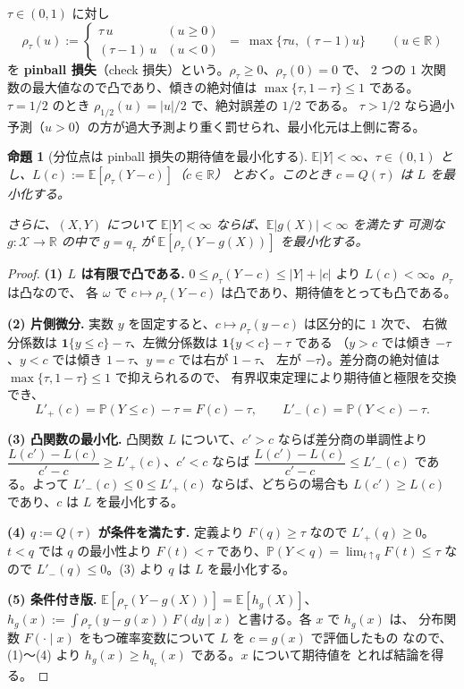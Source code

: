 \documentclass[a4paper,11pt]{jsarticle}
\theoremstyle{definition}
\theoremstyle{plain}
\newtheorem{proposition}[definition]{命題}
\theoremstyle{remark}
\newcommand{\Prob}{\mathbb{P}}
\newcommand{\Exp}{\mathbb{E}}
\newcommand{\Real}{\mathbb{R}}
\newcommand{\Ind}{\mathbf{1}}                  %
\begin{document}
$\tau\in(0,1)$ に対し
\begin{equation}
  \label{eq:pinball}
  \rho_\tau(u):=\begin{cases}\tau\,u & (u\ge0)\\ (\tau-1)\,u & (u<0)\end{cases}
  \ =\ \max\{\tau u,\ (\tau-1)u\}\qquad(u\in\Real)
\end{equation}
を \textbf{pinball 損失}（check 損失）という。$\rho_\tau\ge0$、$\rho_\tau(0)=0$ で、
$2$ つの $1$ 次関数の最大値なので凸であり、傾きの絶対値は $\max\{\tau,1-\tau\}\le1$
である。$\tau=1/2$ のとき $\rho_{1/2}(u)=|u|/2$ で、絶対誤差の $1/2$ である。
$\tau>1/2$ なら過小予測（$u>0$）の方が過大予測より重く罰せられ、最小化元は上側に寄る。

\begin{proposition}[分位点は pinball 損失の期待値を最小化する]
  \label{prop:pinball-quantile}
  $\Exp|Y|<\infty$、$\tau\in(0,1)$ とし、$L(c):=\Exp[\rho_\tau(Y-c)]$（$c\in\Real$）
  とおく。このとき $c=Q(\tau)$ は $L$ を最小化する。

  さらに、$(X,Y)$ について $\Exp|Y|<\infty$ ならば、$\Exp|g(X)|<\infty$ を満たす
  可測な $g\colon\mathcal{X}\to\Real$ の中で $g=q_\tau$ が
  $\Exp[\rho_\tau(Y-g(X))]$ を最小化する。
\end{proposition}

\begin{proof}
  \textbf{(1) $L$ は有限で凸である.}
  $0\le\rho_\tau(Y-c)\le|Y|+|c|$ より $L(c)<\infty$。$\rho_\tau$ は凸なので、
  各 $\omega$ で $c\mapsto\rho_\tau(Y-c)$ は凸であり、期待値をとっても凸である。

  \textbf{(2) 片側微分.}
  実数 $y$ を固定すると、$c\mapsto\rho_\tau(y-c)$ は区分的に $1$ 次で、
  右微分係数は $\Ind\{y\le c\}-\tau$、左微分係数は $\Ind\{y<c\}-\tau$ である
  （$y>c$ では傾き $-\tau$、$y<c$ では傾き $1-\tau$、$y=c$ では右が $1-\tau$、
  左が $-\tau$）。差分商の絶対値は $\max\{\tau,1-\tau\}\le1$ で抑えられるので、
  有界収束定理により期待値と極限を交換でき、
  \begin{equation*}
    L'_+(c)=\Prob(Y\le c)-\tau=F(c)-\tau,\qquad L'_-(c)=\Prob(Y<c)-\tau .
  \end{equation*}

  \textbf{(3) 凸関数の最小化.}
  凸関数 $L$ について、$c'>c$ ならば差分商の単調性より
  $\dfrac{L(c')-L(c)}{c'-c}\ge L'_+(c)$、$c'<c$ ならば
  $\dfrac{L(c')-L(c)}{c'-c}\le L'_-(c)$ である。よって $L'_-(c)\le0\le L'_+(c)$
  ならば、どちらの場合も $L(c')\ge L(c)$ であり、$c$ は $L$ を最小化する。

  \textbf{(4) $q:=Q(\tau)$ が条件を満たす.}
  定義より $F(q)\ge\tau$ なので $L'_+(q)\ge0$。$t<q$ では $q$ の最小性より
  $F(t)<\tau$ であり、$\Prob(Y<q)=\lim_{t\uparrow q}F(t)\le\tau$ なので
  $L'_-(q)\le0$。(3) より $q$ は $L$ を最小化する。

  \textbf{(5) 条件付き版.}
  $\Exp[\rho_\tau(Y-g(X))]=\Exp[h_g(X)]$、
  $h_g(x):=\int\rho_\tau(y-g(x))\,F(dy\mid x)$ と書ける。各 $x$ で $h_g(x)$ は、
  分布関数 $F(\cdot\mid x)$ をもつ確率変数について $L$ を $c=g(x)$ で評価したもの
  なので、(1)〜(4) より $h_g(x)\ge h_{q_\tau}(x)$ である。$x$ について期待値を
  とれば結論を得る。
\end{proof}
\end{document}
